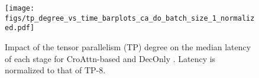 \begin{figure}[!t]
    \centering
    \texttt{[image: figs/tp\_degree\_vs\_time\_barplots\_ca\_do\_batch\_size\_1\_normalized.pdf]}
    \caption{Impact of the tensor parallelism (TP) degree on the median latency of each stage for CroAttn-based and DecOnly \lmms{}.
    Latency is normalized to that of TP-8.
    }
    \label{fig:model-parallelism}
\end{figure}